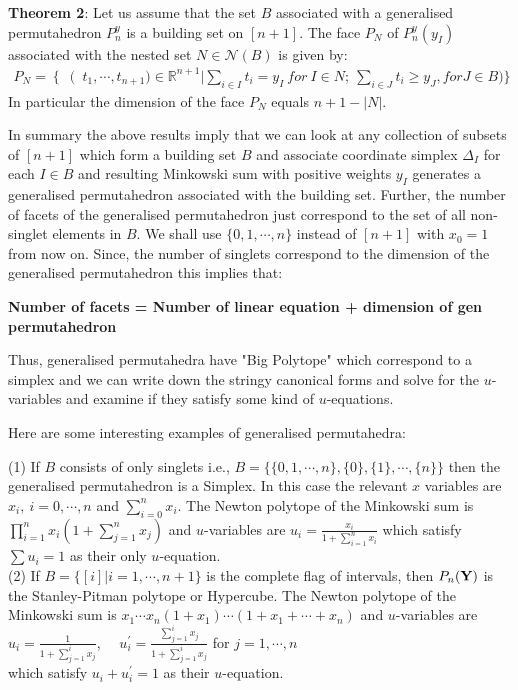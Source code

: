 \documentclass[hidelinks,12pt]{article}
\newcommand{\bea}[1]{\begin{eqnarray}\label{#1} }
\newcommand{\eea}{\end{eqnarray}}
\def\bea{\begin{eqnarray}}
\def\eea{\end{eqnarray}}
\begin{document}
\begin{enumerate}
{\bf Theorem 2}: Let us assume that the set $B$ associated with a generalised permutahedron $P_n^{y}$ is a building set on $[n+1]$. The face $P_N$ of $P_n^{y}(y_I)$ associated with the nested set $N \in \mathcal{N}(B)$ is given by:
\bea
P_N = \left \{ \right (t_1,\cdots,t_{n+1}) \in \mathbb{R}^{n+1} | \sum_{i \in I} t_i =y_{I}~for~I \in N; ~ \sum_{i \in J}t_i \geq y_J, for J \in B  )\}
\eea
In particular the dimension of the face $P_N$ equals $n+1-|N|$. 

In summary the above results imply that we can look at any collection of subsets of $[n+1]$ which form a building set $B$ and associate  coordinate simplex $\Delta_I$ for each $I \in B$ and resulting Minkowski sum with positive weights $y_I$ generates a generalised permutahedron associated with the building set. Further, the number of facets of the generalised permutahedron just correspond to the set of all non-singlet elements in $B$.  
We shall use $ \{0,1,\cdots,n \}$ instead of $[n+1]$ with $x_0 =1$ from now on. Since, the number of singlets correspond to the dimension of the generalised permutahedron this implies that:

{\bf Number of facets = Number of linear equation + dimension of  gen permutahedron}
 
Thus, generalised permutahedra have "Big Polytope" which correspond to a simplex and we can write down the stringy canonical forms and solve for the $u$-variables and examine if they satisfy some kind of $u$-equations.

Here are some interesting examples of generalised permutahedra:

(1) If $B$ consists of only singlets i.e., $B=\{ \{ 0,1,\cdots,n \}, \{ 0 \},\{ 1 \},\cdots ,\{ n \} \}$ then the generalised permutahedron is a Simplex. In this case the relevant $x$ variables are $x_i,~ i=0,\cdots,n$ and $\sum_{i=0}^n x_i$. 
The Newton polytope of the Minkowski sum is $\prod_{i=1}^{n} x_i (1+\sum_{j=1}^{n} x_j)$ and $u$-variables are 
$u_i =\frac{ x_i}{1+\sum_{i=1}^n x_i} $
which satisfy $\sum u_i =1$ as their only $u$-equation. \\

(2) If $B= \{[i] | i=1,\cdots,n+1 \}$ is the complete flag of intervals, then $P_n({\bf Y})$ is the Stanley-Pitman polytope or Hypercube.
The Newton polytope of the Minkowski sum is $x_1\cdots x_n (1+x_1) \cdots (1+x_1+\cdots +x_n)$ and $u$-variables are 
$u_i =\frac{ 1}{1+\sum_{j=1}^{i} x_j} $, ~~$u^{'}_i =\frac{ \sum_{j=1}^{i} x_j}{1+\sum_{j=1}^{i} x_j} $ for $j=1,\cdots,n$ \\
which satisfy $u_i +u^{'}_{i} =1$ as their $u$-equation. \\


\end{enumerate}
\end{document}
